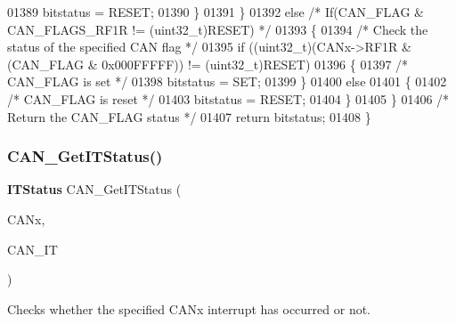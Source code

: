\begin{DoxyCode}
01389       bitstatus = RESET;
01390     \}
01391   \}
01392   \textcolor{keywordflow}{else} \textcolor{comment}{/* If(CAN\_FLAG & CAN\_FLAGS\_RF1R != (uint32\_t)RESET) */}
01393   \{ 
01394     \textcolor{comment}{/* Check the status of the specified CAN flag */}
01395     \textcolor{keywordflow}{if} ((uint32\_t)(CANx->RF1R & (CAN\_FLAG & 0x000FFFFF)) != (uint32\_t)RESET)
01396     \{ 
01397       \textcolor{comment}{/* CAN\_FLAG is set */}
01398       bitstatus = SET;
01399     \}
01400     \textcolor{keywordflow}{else}
01401     \{ 
01402       \textcolor{comment}{/* CAN\_FLAG is reset */}
01403       bitstatus = RESET;
01404     \}
01405   \}
01406   \textcolor{comment}{/* Return the CAN\_FLAG status */}
01407   \textcolor{keywordflow}{return}  bitstatus;
01408 \}
\end{DoxyCode}
\mbox{\label{group__CAN__Group6_ga9aca05b3013e1b3438f3559f80b33c82}} 
\subsubsection{C\+A\+N\+\_\+\+Get\+I\+T\+Status()}
{\footnotesize\ttfamily \textbf{ I\+T\+Status} C\+A\+N\+\_\+\+Get\+I\+T\+Status (\begin{DoxyParamCaption}\item[{\textbf{ C\+A\+N\+\_\+\+Type\+Def} $\ast$}]{C\+A\+Nx,  }\item[{uint32\+\_\+t}]{C\+A\+N\+\_\+\+IT }\end{DoxyParamCaption})}



Checks whether the specified C\+A\+Nx interrupt has occurred or not. 


